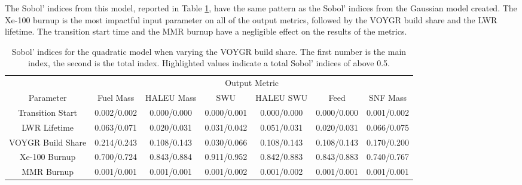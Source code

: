 The Sobol' indices from this model, reported in Table 
\ref{tab:s7_sobol_voygr_quadratic},
have the same pattern as the Sobol' indices from the Gaussian model created. 
The Xe-100 burnup is the most impactful input parameter on all of the 
output metrics, followed by the VOYGR build share and the \gls{LWR} lifetime. 
The transition start time and the \gls{MMR} burnup have a negligible effect 
on the results of the metrics. 

\begin{table}
    \centering
    \caption{Sobol' indices for the quadratic model when varying the VOYGR 
    build share. The first number is the main index, the second is the total 
    index. Highlighted 
    values indicate a total Sobol' indices of above 0.5.}
    \label{tab:s7_sobol_voygr_quadratic}
    \begin{tabular}{c c c c c c c}
        \hline
        & \multicolumn{6}{c}{Output Metric} \\
        Parameter & Fuel Mass & HALEU Mass & SWU & HALEU SWU & Feed & SNF Mass \\
        \hline
        Transition Start & 0.002/0.002 & 0.000/0.000 & 0.000/0.001 &
                           0.000/0.000 & 0.000/0.000 & 0.001/0.002\\
        LWR Lifetime & 0.063/0.071 & 0.020/0.031 & 0.031/0.042 &
                       0.051/0.031 & 0.020/0.031 & 0.066/0.075\\
        VOYGR Build Share & 0.214/0.243 & 0.108/0.143 & 0.030/0.066 &
                            0.108/0.143 & 0.108/0.143 & 0.170/0.200\\
        Xe-100 Burnup & \cellcolor{green!25}0.700/0.724 & \cellcolor{green!25}0.843/0.884 & \cellcolor{green!25}0.911/0.952 &
        \cellcolor{green!25}0.842/0.883 &\cellcolor{green!25} 0.843/0.883 & \cellcolor{green!25}0.740/0.767\\
        MMR Burnup & 0.001/0.001 & 0.001/0.001 & 0.001/0.002 &
                     0.001/0.002 & 0.001/0.001 & 0.001/0.001\\
        \hline        
    \end{tabular}
\end{table}

